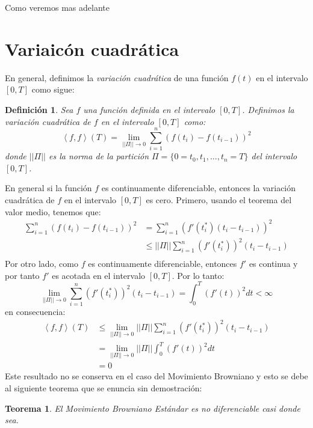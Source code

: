 \documentclass{extreport}
\theoremstyle{definicion}
\newtheorem{definition}{Definición}[chapter]
\theoremstyle{propiedad}
\theoremstyle{teorema}
\newtheorem{teorema}{Teorema}[chapter]
\begin{document}
Como veremos mas adelante 

 \section{Variaicón cuadrática}

En general, definimos la \emph{variación cuadrática} de una función $f(t)$ en el intervalo $[0,T]$ como sigue:
\begin{definition}
    Sea $f$ una función definida en el intervalo $[0,T]$. Definimos la \emph{variación cuadrática} de $f$ en el intervalo $[0,T]$ como:
    \begin{equation}
        \left\langle f, f\right\rangle(T) = \lim_{||\Pi||\rightarrow 0}\sum_{i=1}^{n}\left(f(t_i) - f(t_{i-1})\right)^2
        \label{varquad:2}
    \end{equation}
    donde $||\Pi||$ es la norma de la partición $\Pi = \{0 = t_0, t_1, \ldots, t_n = T\}$ del intervalo $[0,T]$.
\end{definition}

En general si la función $f$ es continuamente diferenciable, entonces la variación cuadrática de $f$ en el intervalo $[0,T]$ es cero.
Primero, usando el teorema del valor medio, tenemos que:
\begin{align*}
    \sum_{i=1}^{n}\left(f(t_i) - f(t_{i-1})\right)^2  & = \sum_{i=1}^{n}\left(f'(t^*_i)(t_i-t_{i-1})\right)^2\\
                                                      & \leq ||\Pi||\sum_{i=1}^{n}\left(f'(t^*_i)\right)^2(t_i-t_{i-1})\\
\end{align*}
Por otro lado, como $f$ es continuamente diferenciable, entonces $f'$ es continua y por tanto $f'$ es acotada en el intervalo $[0,T]$. Por lo tanto:
$$
\lim_{||\Pi||\rightarrow 0}\sum_{i=1}^{n}\left(f'(t^*_i)\right)^2(t_i-t_{i-1}) = \int_0^T\left(f'(t)\right)^2dt < \infty
$$
en consecuencia:
\begin{align*}
    \left\langle f, f\right\rangle(T) & \leq \lim_{||\Pi||\rightarrow 0}||\Pi||\sum_{i=1}^{n}\left(f'(t^*_i)\right)^2(t_i-t_{i-1})\\
                                      & = \lim_{||\Pi||\rightarrow 0}||\Pi||\int_0^T\left(f'(t)\right)^2dt\\
                                      & = 0
\end{align*}
Este resultado no se conserva en el caso del Movimiento Browniano y esto se debe al siguiente teorema que se enuncia sin demostración:

\begin{teorema}
    El Movimiento Browniano Estándar es no diferenciable casi donde sea.
\end{teorema}
\end{document}
